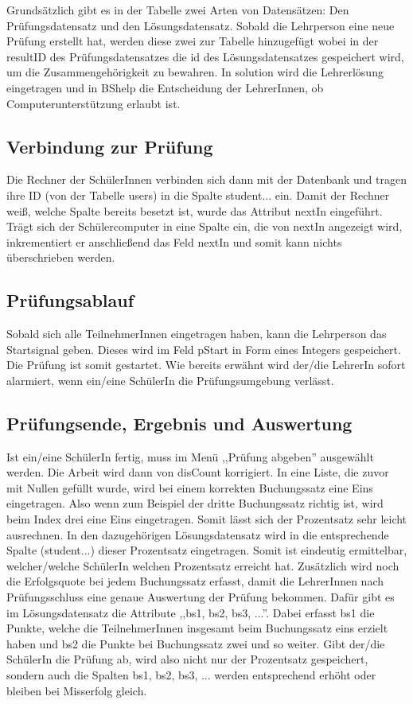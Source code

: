 \documentclass[12pt]{report}
\begin{document}
\noindent Grundsätzlich gibt es in der Tabelle zwei Arten von Datensätzen: Den Prüfungsdatensatz und den Lösungsdatensatz. Sobald die Lehrperson eine neue Prüfung erstellt hat, werden diese zwei zur Tabelle hinzugefügt wobei in der resultID des Prüfungsdatensatzes die id des Lösungsdatensatzes gespeichert wird, um die Zusammengehörigkeit zu bewahren. In solution wird die Lehrerlösung eingetragen und in BShelp die Entscheidung der LehrerInnen, ob Computerunterstützung erlaubt ist. 

\subsection{Verbindung zur Prüfung}

Die Rechner der SchülerInnen verbinden sich dann mit der Datenbank und tragen ihre ID (von der Tabelle users) in die Spalte student... ein. Damit der Rechner weiß, welche Spalte bereits besetzt ist, wurde das Attribut nextIn eingeführt. Trägt sich der Schülercomputer in eine Spalte ein, die von nextIn angezeigt wird, inkrementiert er anschließend das Feld nextIn und somit kann nichts überschrieben werden.

\subsection{Prüfungsablauf}

Sobald sich alle TeilnehmerInnen eingetragen haben, kann die Lehrperson das Startsignal geben. Dieses wird im Feld pStart in Form eines Integers gespeichert. Die Prüfung ist somit gestartet. Wie bereits erwähnt wird der/die LehrerIn sofort alarmiert, wenn ein/eine SchülerIn die Prüfungsumgebung verlässt.

\subsection{Prüfungsende, Ergebnis und Auswertung}

Ist ein/eine SchülerIn fertig, muss im Menü ,,Prüfung abgeben'' ausgewählt werden. Die Arbeit wird dann von disCount korrigiert. In eine Liste, die zuvor mit Nullen gefüllt wurde, wird bei einem korrekten Buchungssatz eine Eins eingetragen. Also wenn zum Beispiel der dritte Buchungssatz richtig ist, wird beim Index drei eine Eins eingetragen. Somit lässt sich der Prozentsatz sehr leicht ausrechnen. In den dazugehörigen Lösungsdatensatz wird in die entsprechende Spalte (student...) dieser Prozentsatz eingetragen. Somit ist eindeutig ermittelbar, welcher/welche SchülerIn welchen Prozentsatz erreicht hat. Zusätzlich wird noch die Erfolgsquote bei jedem Buchungssatz erfasst, damit die LehrerInnen nach Prüfungsschluss eine genaue Auswertung der Prüfung bekommen. Dafür gibt es im Lösungsdatensatz die Attribute ,,bs1, bs2, bs3, ...''. Dabei erfasst bs1 die Punkte, welche die TeilnehmerInnen insgesamt beim Buchungssatz eins erzielt haben und bs2 die Punkte bei Buchungssatz zwei und so weiter. Gibt der/die SchülerIn die Prüfung ab, wird also nicht nur der Prozentsatz gespeichert, sondern auch die Spalten bs1, bs2, bs3, ... werden entsprechend erhöht oder bleiben bei Misserfolg gleich. 
\end{document}
